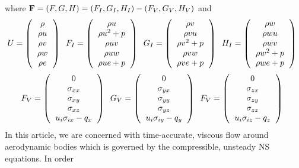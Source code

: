 where ${\bf F} = (F,G,H) = (F_I,G_I,H_I) - (F_V,G_V,H_V)$ and
\begin{equation}
U = \l(
\begin{tabular}{c}
$\rho$\\
$\rho u$\\
$\rho v$\\
$\rho w$\\
$\rho e$
\end{tabular}
\r) \;\; 
F_I = \l(
\begin{tabular}{c}
$\rho u$\\
$\rho u^2 + p$\\
$\rho uv$\\
$\rho uw$\\
$\rho ue + p$
\end{tabular}
\r) \;\; 
G_I = \l(
\begin{tabular}{c}
$\rho v$\\
$\rho vu$\\
$\rho v^2 + p$\\
$\rho vw$\\
$\rho ve+p$
\end{tabular}
\r) \;\; 
H_I = \l(
\begin{tabular}{c}
$\rho w$\\
$\rho wu$\\
$\rho wv$\\
$\rho w^2 + p$\\
$\rho we + p$
\end{tabular}
\r) \;\; 
\end{equation}
\begin{equation}
F_V = \l(
\begin{tabular}{c}
$0$\\
$\sigma_{xx}$\\
$\sigma_{xy}$\\
$\sigma_{xz}$\\
$u_i\sigma_{ix}-q_x$
\end{tabular}
\r) \;\; 
G_V = \l(
\begin{tabular}{c}
$0$\\
$\sigma_{yx}$\\
$\sigma_{yy}$\\
$\sigma_{yz}$\\
$u_i\sigma_{iy}-q_y$
\end{tabular}
\r) \;\; 
F_V = \l(
\begin{tabular}{c}
$0$\\
$\sigma_{zx}$\\
$\sigma_{zy}$\\
$\sigma_{zz}$\\
$u_i\sigma_{iz}-q_z$
\end{tabular}
\r) \;\; 
\end{equation}
In this article, we are concerned with time-accurate, viscous flow around aerodynamic bodies which is governed by the compressible, unsteady NS equations. In order 


